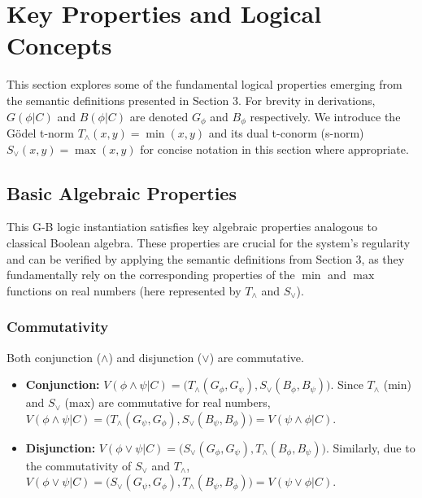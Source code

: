 \documentclass[11pt]{article}
\newcommand{\GB}[2]{\bigl(#1,#2\bigr)} %
\theoremstyle{remark}
\begin{document}
\section{Key Properties and Logical Concepts}
This section explores some of the fundamental logical properties emerging from the semantic definitions presented in Section 3. For brevity in derivations, $G(\phi|C)$ and $B(\phi|C)$ are denoted $G_\phi$ and $B_\phi$ respectively. We introduce the Gödel t-norm $T_\wedge(x,y)=\min(x,y)$ and its dual t-conorm (s-norm) $S_\vee(x,y)=\max(x,y)$ for concise notation in this section where appropriate.

\subsection{Basic Algebraic Properties} \label{sec:algebraic_props}
This G-B logic instantiation satisfies key algebraic properties analogous to classical Boolean algebra. These properties are crucial for the system's regularity and can be verified by applying the semantic definitions from Section 3, as they fundamentally rely on the corresponding properties of the $\min$ and $\max$ functions on real numbers (here represented by $T_\wedge$ and $S_\vee$).

\subsubsection{Commutativity}
Both conjunction ($\land$) and disjunction ($\lor$) are commutative.
\begin{itemize}
    \item \textbf{Conjunction:} $V(\phi \land \psi|C) = \GB{T_\wedge(G_\phi, G_\psi)}{S_\vee(B_\phi, B_\psi)}$. Since $T_\wedge$ (min) and $S_\vee$ (max) are commutative for real numbers, $V(\phi \land \psi|C) = \GB{T_\wedge(G_\psi, G_\phi)}{S_\vee(B_\psi, B_\phi)} = V(\psi \land \phi|C)$.
    \item \textbf{Disjunction:} $V(\phi \lor \psi|C) = \GB{S_\vee(G_\phi, G_\psi)}{T_\wedge(B_\phi, B_\psi)}$. Similarly, due to the commutativity of $S_\vee$ and $T_\wedge$, $V(\phi \lor \psi|C) = \GB{S_\vee(G_\psi, G_\phi)}{T_\wedge(B_\psi, B_\phi)} = V(\psi \lor \phi|C)$.
\end{itemize}
\end{document}
